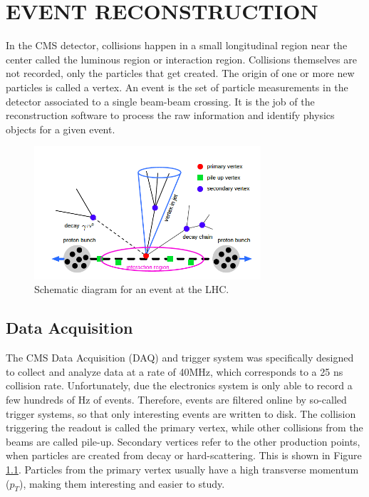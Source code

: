 %
%
%
%



\chapter{EVENT RECONSTRUCTION \label{cha:eventreco}}
In the CMS detector, collisions happen in a small longitudinal region near the center called the luminous region or interaction region. Collisions themselves are not recorded, only the particles that get created. The origin of one or more new particles is called a vertex. An event is the set of particle measurements in the detector associated to a single beam-beam crossing. It is the job of the reconstruction software to process the raw information and identify physics objects for a given event.

 \begin{figure}[H]
 	\centering
 	\includegraphics[width=0.75\textwidth]{figures/eventvertex.png}
 	\singlespace
 	\caption{Schematic diagram for an event at the LHC.}
 	\label{fig:vertex}
 \end{figure}


\section{Data Acquisition}
The CMS Data Acquisition (DAQ) and trigger system was specifically designed to collect and analyze data at a rate of 40MHz, which corresponds to a 25 ns collision rate. Unfortunately, due the electronics system is only able to record a few hundreds of Hz of events. Therefore, events are filtered online by so-called trigger systems, so that only interesting events are written to disk. The collision triggering the readout is called the primary vertex, while other collisions from the beams are called pile-up. Secondary vertices refer to the other production points, when particles are created from decay or hard-scattering. This is shown in Figure \ref{fig:vertex}. Particles from the primary vertex usually have a high transverse momentum ($p_{T}$), making them interesting and easier to study.

